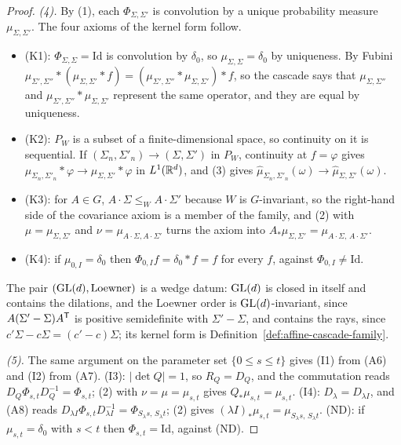 \begin{proof}
\emph{(4).} By (1), each $\Phi_{\Sigma,\Sigma'}$ is convolution by a unique probability measure
$\mu_{\Sigma,\Sigma'}$. The four axioms of the kernel form follow.
\begin{itemize}
\item (K1): $\Phi_{\Sigma,\Sigma} = \mathrm{Id}$ is convolution by $\delta_0$, so
$\mu_{\Sigma,\Sigma} = \delta_0$ by uniqueness. By Fubini
$\mu_{\Sigma',\Sigma''} * (\mu_{\Sigma,\Sigma'} * f) = (\mu_{\Sigma',\Sigma''} *
\mu_{\Sigma,\Sigma'}) * f$, so the cascade says that $\mu_{\Sigma,\Sigma''}$ and
$\mu_{\Sigma',\Sigma''} * \mu_{\Sigma,\Sigma'}$ represent the same operator, and they are equal by
uniqueness.
\item (K2): $P_W$ is a subset of a finite-dimensional space, so continuity on it is sequential. If
$(\Sigma_n,\Sigma'_n) \to (\Sigma,\Sigma')$ in $P_W$, continuity at $f = \varphi$ gives
$\mu_{\Sigma_n,\Sigma'_n} * \varphi \to \mu_{\Sigma,\Sigma'} * \varphi$ in $L^1(\mathbb{R}^d)$, and (3)
gives $\widehat\mu_{\Sigma_n,\Sigma'_n}(\omega) \to \widehat\mu_{\Sigma,\Sigma'}(\omega)$.
\item (K3): for $A \in G$, $A\cdot\Sigma \le_W A\cdot\Sigma'$ because $W$ is $G$-invariant, so the
right-hand side of the covariance axiom is a member of the family, and (2) with
$\mu = \mu_{\Sigma,\Sigma'}$ and $\nu = \mu_{A\cdot\Sigma,A\cdot\Sigma'}$ turns the axiom into
$A_*\mu_{\Sigma,\Sigma'} = \mu_{A\cdot\Sigma,\,A\cdot\Sigma'}$.
\item (K4): if $\mu_{0,I} = \delta_0$ then $\Phi_{0,I}f = \delta_0 * f = f$ for every $f$, against
$\Phi_{0,I} \ne \mathrm{Id}$.
\end{itemize}
The pair $(\mathrm{GL}(d), \text{Loewner})$ is a wedge
datum: $\mathrm{GL}(d)$ is closed in itself and contains the dilations, and the Loewner order is
$\mathrm{GL}(d)$-invariant, since $A(\Sigma' - \Sigma)A^{\mathsf{T}}$ is positive semidefinite with
$\Sigma' - \Sigma$, and contains the rays, since $c'\Sigma - c\Sigma = (c' - c)\Sigma$; its kernel
form is Definition~\ref{def:affine-cascade-family}.

\emph{(5).} The same argument on the parameter set $\{0 \le s \le t\}$ gives (I1) from (A6) and
(I2) from (A7). (I3): $|\det Q| = 1$, so $R_Q = D_Q$, and the commutation reads
$D_Q\Phi_{s,t}D_Q^{-1} = \Phi_{s,t}$; (2) with $\nu = \mu = \mu_{s,t}$ gives
$Q_*\mu_{s,t} = \mu_{s,t}$. (I4): $D_\lambda = D_{\lambda I}$, and (A8) reads
$D_{\lambda I}\Phi_{s,t}D_{\lambda I}^{-1} = \Phi_{S_\lambda s,\,S_\lambda t}$; (2) gives
$(\lambda I)_*\mu_{s,t} = \mu_{S_\lambda s,\,S_\lambda t}$. (ND): if $\mu_{s,t} = \delta_0$ with
$s < t$ then $\Phi_{s,t} = \mathrm{Id}$, against (ND).
\end{proof}

